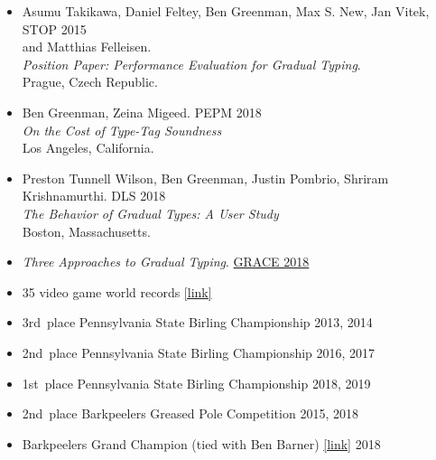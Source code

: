 \documentclass{article}
\begin{document}
\begin{itemize}
\item
  Asumu Takikawa, Daniel Feltey, Ben Greenman, Max S. New, Jan Vitek, \hfill STOP 2015 \\
   and Matthias Felleisen. \\
   \emph{Position Paper: Performance Evaluation for Gradual Typing}. \\
  Prague, Czech Republic.
\item
  Ben Greenman, Zeina Migeed. \hfill PEPM 2018 \\
  \emph{On the Cost of Type-Tag Soundness} \\
  Los Angeles, California.
\item
  Preston Tunnell Wilson, Ben Greenman, Justin Pombrio, Shriram Krishnamurthi. \hfill DLS 2018 \\
  \emph{The Behavior of Gradual Types: A User Study} \\
  Boston, Massachusetts.
\end{itemize}

\begin{itemize}
  \item \emph{Three Approaches to Gradual Typing}. \hfill \href{https://2018.splashcon.org/track/grace-2018-papers}{GRACE 2018}
\end{itemize}


\begin{itemize}
  \item 35 video game world records \href{https://www.twingalaxies.com/scores.php?player=43761}{[link]} \hfill {}
  \item 3rd~place Pennsylvania State Birling Championship \hfill 2013, 2014
  \item 2nd~place Pennsylvania State Birling Championship \hfill 2016, 2017
  \item 1st~place Pennsylvania State Birling Championship \hfill 2018, 2019
  \item 2nd~place Barkpeelers Greased Pole Competition \hfill 2015, 2018
  \item Barkpeelers Grand Champion (tied with Ben Barner) \href{http://lumbermuseum.org/bark-peeler-festival/festival-events-2019/bark-peeler-festival-2018/}{[link]} \hfill 2018
\end{itemize}
\end{document}
